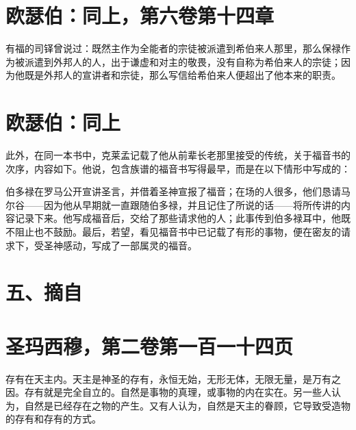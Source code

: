 \section{欧瑟伯：同上，第六卷第十四章}

有福的司铎曾说过：既然主作为全能者的宗徒被派遣到希伯来人那里，那么保禄作为被派遣到外邦人的人，出于谦虚和对主的敬畏，没有自称为希伯来人的宗徒；因为他既是外邦人的宣讲者和宗徒，那么写信给希伯来人便超出了他本来的职责。\par


\section{欧瑟伯：同上}

此外，在同一本书中，克莱孟记载了他从前辈长老那里接受的传统，关于福音书的次序，内容如下。他说，包含族谱的福音书写得最早，而是在以下情形中写成的：\par

伯多禄在罗马公开宣讲圣言，并借着圣神宣报了福音；在场的人很多，他们恳请马尔谷——因为他从早期就一直跟随伯多禄，并且记住了所说的话——将所传讲的内容记录下来。他写成福音后，交给了那些请求他的人；此事传到伯多禄耳中，他既不阻止也不鼓励。最后，若望，看见福音书中已记载了有形的事物，便在密友的请求下，受圣神感动，写成了一部属灵的福音。\par


\section{五、摘自}


\section{圣玛西穆，第二卷第一百一十四页}

存有在天主内。天主是神圣的存有，永恒无始，无形无体，无限无量，是万有之因。存有就是完全自立的。自然是事物的真理，或事物的内在实在。另一些人认为，自然是已经存在之物的产生。又有人认为，自然是天主的眷顾，它导致受造物的存有和存有的方式。\par


